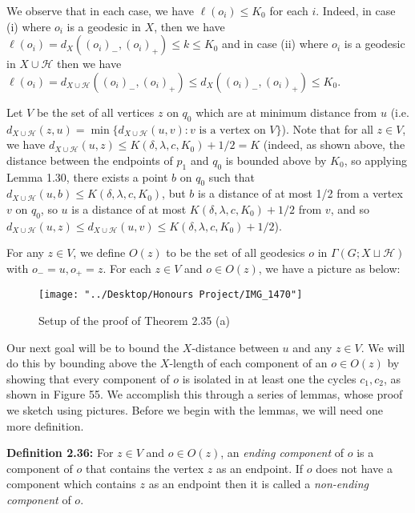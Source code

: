 \documentclass[12pt]{article}
\newcommand{\vs}{\vskip10pt}
\begin{document}
	We observe that in each case, we have $\ell(o_i) \leq K_0$ for each $i$. Indeed, in case (i) where $o_i$ is a geodesic in $X$, then we have $\ell(o_i) = d_X((o_i)_-, (o_i)_+) \leq k \leq K_0$ and in case (ii) where $o_i$ is a geodesic in $X \cup \mathcal{H}$ then we have $\ell(o_i) = d_{X \cup \mathcal{H}}((o_i)_-, (o_i)_+) \leq d_X((o_i)_-, (o_i)_+) \leq K_0$.
	
	\vs 
	
	Let $V$ be the set of all vertices $z$ on $q_0$ which are at minimum distance from $u$ (i.e. $d_{X \cup \mathcal{H}}(z, u) = \min \{d_{X \cup \mathcal{H}}(u, v) : v \text{ is a vertex on } V\}$). Note that for all $z \in V$, we have $d_{X \cup \mathcal{H}}(u, z) \leq K(\delta, \lambda, c, K_0) + 1/2 = K$ (indeed, as shown above, the distance between the endpoints of $p_1$ and $q_0$ is bounded above by $K_0$, so applying Lemma 1.30, there exists a point $b$ on $q_0$ such that $d_{X \cup \mathcal{H}} (u, b) \leq K(\delta, \lambda, c, K_0)$, but $b$ is a distance of at most 1/2 from a vertex $v$ on $q_0$, so $u$ is a distance of at most $K(\delta, \lambda, c, K_0) + 1/2$ from $v$, and so $d_{X \cup \mathcal{H}}(u,z) \leq d_{X \cup \mathcal{H}}(u,v) \leq K(\delta, \lambda, c, K_0) + 1/2$). 
	
	\vs 
	
	For any $z \in V$, we define $O(z)$ to be the set of all geodesics $o$ in $\Gamma(G; X \sqcup \mathcal{H})$ with $o_- = u, o_+ = z$. For each $z \in V$ and $o \in O(z)$, we have a picture as below: 
	
\begin{figure} [H]
	\centering
	\texttt{[image: "../Desktop/Honours Project/IMG\_1470"]}
	\caption{Setup of the proof of Theorem 2.35 (a)}
	\label{fig:img1470}
\end{figure}
	
	Our next goal will be to bound the $X$-distance between $u$ and any $z \in V$. We will do this by bounding above the $X$-length of each component of an $o \in O(z)$ by showing that every component of $o$ is isolated in at least one the cycles $c_1, c_2$, as shown in Figure 55. We accomplish this through a series of lemmas, whose proof we sketch using pictures. Before we begin with the lemmas, we will need one more definition. 
	
	\vs 
	
	\textbf{Definition 2.36: } For $z \in V$ and $o \in O(z)$, an \textit{ending component} of $o$ is a component of $o$ that contains the vertex $z$ as an endpoint. If $o$ does not have a component which contains $z$ as an endpoint then it is called a \textit{non-ending component} of $o$.
	
\end{document}
